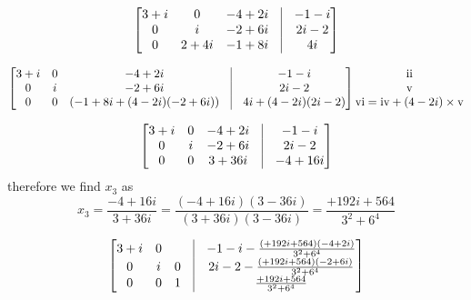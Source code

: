 \documentclass[a4paper,10pt]{article}
\newcommand{\RN}[1]{%
  \textup{\uppercase\expandafter{\romannumeral#1}}%
}
\begin{document}
\[
 \begin{bmatrix}
 3+i & 0     & -4+2i & \vline & -1-i\\
 0   & i     & -2+6i & \vline & 2i-2\\
 0   & 2+4i  & -1+8i & \vline & 4i\\
\end{bmatrix}
\]

\[
 \begin{bmatrix}
 3+i & 0     & -4+2i & \vline & -1-i\\
 0   & i     & -2+6i & \vline & 2i-2\\
 0   & 0     & (-1+8i +(4-2i)(-2+6i)) & \vline & 4i+(4-2i)(2i-2)\\
\end{bmatrix}
\begin{matrix}
\RN{2}\\ \RN{5} \\ \RN{6}=\RN{4}+(4-2i)\times \RN{5}\\
\end{matrix}
\]

\[
 \begin{bmatrix}
 3+i & 0     & -4+2i & \vline & -1-i\\
 0   & i     & -2+6i & \vline & 2i-2\\
 0   & 0     & 3+36i & \vline & -4+16i\\
\end{bmatrix}
\]
therefore we find $x_3$ as
\[
x_3= \frac{-4+16i}{3+36i}=\frac{(-4+16i)(3-36i)}{(3+36i)(3-36i)}=\frac{+192i+564}{3^2+6^4}
\]

\[
 \begin{bmatrix}
 3+i & 0     &     & \vline & -1-i- \frac{(+192i+564)(-4+2i)}{3^2+6^4}\\
 0   & i     & 0   & \vline & 2i-2-\frac{(+192i+564)(-2+6i)}{3^2+6^4}\\
 0   & 0     & 1   & \vline & \frac{+192i+564}{3^2+6^4}\\
\end{bmatrix}
\]
\end{document}
